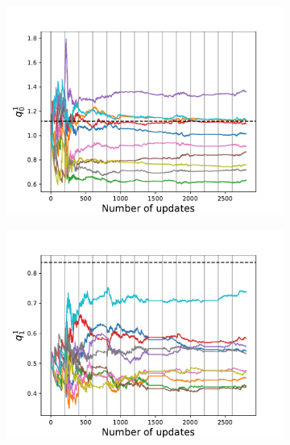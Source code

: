 \begin{figure}[H]
	\begin{subfigure}{.5\textwidth}
		\centering
		\includegraphics[width=1\linewidth]{figures/q_convergence/Q1_01}
		\caption{}
		\label{fig:Q1_01}
	\end{subfigure}
	\begin{subfigure}{.5\textwidth}
		\centering
		\includegraphics[width=1\linewidth]{figures/q_convergence/Q1_10}
		\caption{}
		\label{fig:Q1_10}
	\end{subfigure}\\
	\begin{subfigure}{.5\textwidth}
		\centering

\end{subfigure}
\end{figure}
